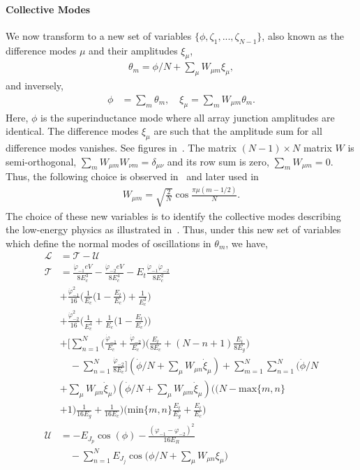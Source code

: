 \documentclass[%
reprint,
superscriptaddress,
 amsmath,amssymb,
 aps,
 prx,
longbibliography,
floatfix,
]{revtex4-2}
\begin{document}
\paragraph{Collective Modes} 
We now transform to a new set of variables $\{\phi,\zeta_1,...,\zeta_{N-1}\}$, also known as the difference modes $\mu$ and their amplitudes $\xi_\mu$,
\begin{align}
    \theta_m=\phi/N+\sum_\mu W_{\mu m}\xi_\mu,
\end{align}
and inversely,
\begin{align}
    \phi&=\sum_{m}\theta_m,\quad \xi_\mu=\sum_m W_{\mu m}\theta_m.
\end{align}
Here, $\phi$ is the superinductance mode where all array junction amplitudes are identical. The difference modes $\xi_\mu$ are such that the amplitude sum for all difference modes vanishes. See figures in~\cite{ferguson2013symmetries}. The matrix $(N-1)\times N$ matrix $W$ is semi-orthogonal, $\sum_m W_{\mu m}W_{\nu m}=\delta_{\mu \nu}$ and its row sum is zero, $\sum_mW_{\mu m}=0$. Thus, the following choice is observed in~\cite{ferguson2013symmetries} and later used in~\cite{viola2015collective}
\begin{align}
    W_{\mu m}=\sqrt{\frac{2}{N}}\cos{\frac{\pi\mu(m-1/2)}{N}}.
\end{align}
The choice of these new variables is to identify the collective modes describing the low-energy physics as illustrated in~\cite{catelani2011relaxation,koch2009charging,manucharyan2009fluxonium}. Thus, under this new set of variables which define the normal modes of oscillations in $\theta_m$, we have,
\begin{align}
    \mathcal{L}&=\mathcal{T}-\mathcal{U}\\
    \mathcal{T}&=\frac{\dot{\varphi}_{-1}eV}{8E_c^3}-\frac{\dot{\varphi}_{-2}eV}{8E_c^4}-E_t\frac{\dot{\varphi}_{-1}\dot{\varphi}_{-2}}{8E_c^2}\nonumber\\
    &+\frac{\dot{\varphi}^2_{-1}}{16}\Big(\frac{1}{E_c}\Big(1-\frac{E_t}{E_c}\Big)+\frac{1}{E_c^3}\Big)\\&+\frac{\dot{\varphi}^2_{-2}}{16}\Big(\frac{1}{E_c^4}+\frac{1}{E_c}\Big(1-\frac{E_t}{E_c}\Big)\Big)\nonumber\\
      &+\Big[\sum_{n=1}^N\Big(\frac{\dot{\varphi}_{-1}}{E_c}+\frac{\dot{\varphi}_{-2}}{E_c}\Big)\Big(\frac{E_t}{8E_c}+(N-n+1)\frac{E_t}{8E_g}\Big)\nonumber\\&\quad-\sum_{n=1}^N\frac{\dot{\varphi}_{-2}}{8E_c}\Big](\dot{\phi}/N+\sum_\mu W_{\mu n}\dot{\xi}_\mu)+\sum_{m=1}^N\sum_{n=1}^N(\dot{\phi}/N\nonumber\\
  &+\sum_\mu W_{\mu n}\dot{\xi}_\mu)(\dot{\phi}/N+\sum_\mu W_{\mu m}\dot{\xi}_\mu)\Big( (N-\text{max}\{m,n\}\nonumber\\&+1)\frac{1}{16E_g}+\frac{1}{16E_c}\Big)\Big(\text{min}\{m,n\}\frac{E_t}{E_g}+\frac{E_t}{E_c}\Big)\label{eq:kin-energy}\\
    \mathcal{U}&=-E_{J_p}\cos(\phi)-\frac{(\varphi_{-1}-\varphi_{-2})^2}{16E_{R}}\nonumber\\&\quad-\sum_{n=1}^NE_{J_j}\cos\Big(\phi/N+\sum_\mu W_{\mu n}\xi_\mu\Big)\label{eq:pot-energy}
\end{align}
\end{document}
